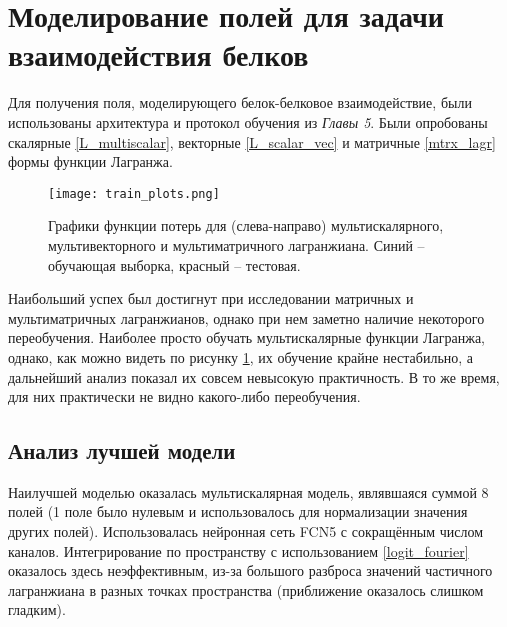 \section{Моделирование полей для задачи взаимодействия белков}

Для получения поля, моделирующего белок-белковое взаимодействие, были использованы архитектура и протокол обучения из \textit{Главы 5}. Были опробованы скалярные \ref{L_multiscalar}, векторные \ref{L_scalar_vec} и матричные \ref{mtrx_lagr} формы функции Лагранжа.
\begin{figure}[H]
	\centering
	\texttt{[image: train\_plots.png]}
	\caption{Графики функции потерь для (слева-направо) мультискалярного, мультивекторного и мультиматричного лагранжиана. Синий -- обучающая выборка, красный -- тестовая.}
	\label{fig_train_plots}
\end{figure}
Наибольший успех был достигнут при исследовании матричных и мультиматричных лагранжианов, однако при нем заметно наличие некоторого переобучения. Наиболее просто обучать мультискалярные функции Лагранжа, однако, как можно видеть по рисунку \ref{fig_train_plots}, их обучение крайне нестабильно, а дальнейший анализ показал их совсем невысокую практичность. В то же время, для них практически не видно какого-либо переобучения. 

\subsection{Анализ лучшей модели}
Наилучшей моделью оказалась мультискалярная модель, являвшаяся суммой 8 полей (1 поле было нулевым и использовалось для нормализации значения других полей). Использовалась нейронная сеть FCN5 с сокращённым числом каналов. Интегрирование по пространству с использованием \ref{logit_fourier} оказалось здесь неэффективным, из-за большого разброса значений частичного лагранжиана в разных точках пространства (приближение оказалось слишком гладким).

